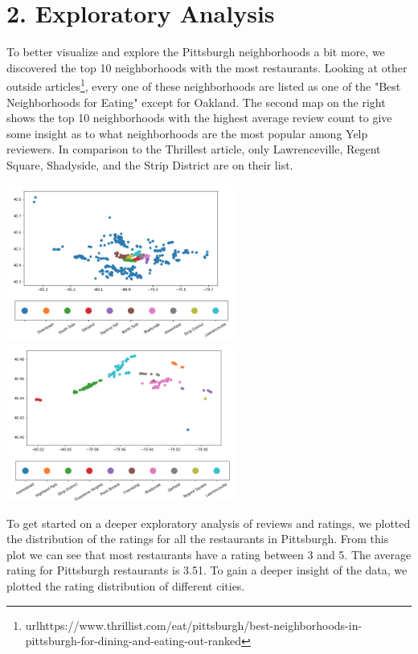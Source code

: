 \documentclass{neu_handout}
\begin{document}
\section*{2. Exploratory Analysis}

To better visualize and explore the Pittsburgh neighborhoods a bit more, we discovered the top 10 neighborhoods with the most restaurants. Looking at other outside articles\footnote{url{https://www.thrillist.com/eat/pittsburgh/best-neighborhoods-in-pittsburgh-for-dining-and-eating-out-ranked}}, every one of these neighborhoods are listed as one of the "Best Neighborhoods for Eating" except for Oakland. The second map on the right shows the top 10 neighborhoods with the highest average review count to give some insight as to what neighborhoods are the most popular among Yelp reviewers. In comparison to the Thrillest article, only Lawrenceville, Regent Square, Shadyside, and the Strip District are on their list.

\begin{center}
\includegraphics[width=75mm,scale=0.5]{pitts_hoods_most_restaurants}
\includegraphics[width=75mm,scale=0.5]{top_10_most_popular_neighborhoods}
\end{center}

To get started on a deeper exploratory analysis of reviews and ratings, we plotted the distribution of the ratings for all the restaurants in Pittsburgh. From this plot we can see that most restaurants have a rating between 3 and 5. The average rating for Pittsburgh restaurants is 3.51. To gain a deeper insight of the data, we plotted the rating distribution of different cities. 
\end{document}

